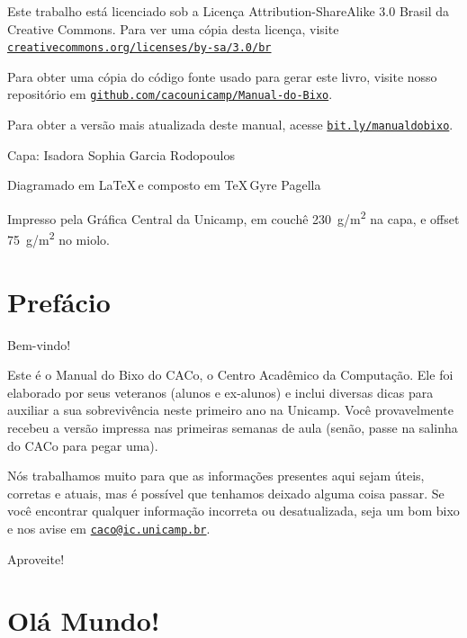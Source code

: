 \documentclass[a4paper,10pt,oldfontcommands]{memoir}
\newcommand{\email}[1]{\href{mailto:#1}{\nolinkurl{#1}}}
\renewcommand{\url}[1]{\href{http://#1}{\nolinkurl{#1}}}
\begin{document}
\begin{center}
Este trabalho está licenciado sob a Licença Attribution-ShareAlike 3.0 Brasil da
Creative Commons. Para ver uma cópia desta licença, visite
\url{creativecommons.org/licenses/by-sa/3.0/br}

Para obter uma cópia do código fonte usado para gerar este livro, visite nosso
repositório em \url{github.com/cacounicamp/Manual-do-Bixo}.

Para obter a versão mais atualizada deste manual, acesse \url{bit.ly/manualdobixo}.

Capa: Isadora Sophia Garcia Rodopoulos

\setlength{\parskip}{0em}
\vfill

Diagramado em \LaTeX\,e composto em \TeX\,Gyre Pagella

Impresso pela Gráfica Central da Unicamp, em couchê \SI{230}{g/m^2} na capa, e offset
\SI{75}{g/m^2} no miolo.

\end{center}
\cleardoublepage
\pagestyle{plain}
\tableofcontents

\chapter{Prefácio}
\setlength{\parskip}{1em}

Bem-vindo!

Este é o Manual do Bixo do CACo, o Centro Acadêmico da Computação. Ele foi
elaborado por seus veteranos (alunos e ex-alunos) e inclui diversas dicas para
auxiliar a sua sobrevivência neste primeiro ano na Unicamp. Você provavelmente
recebeu a versão impressa nas primeiras semanas de aula (senão, passe na salinha
do CACo para pegar uma).

Nós trabalhamos muito para que as informações presentes aqui sejam úteis,
corretas e atuais, mas é possível que tenhamos deixado alguma coisa passar. Se
você encontrar qualquer informação incorreta ou desatualizada, seja um bom bixo
e nos avise em \email{caco@ic.unicamp.br}.

Aproveite!

\setlength{\parskip}{0em}
\mainmatter
\pagestyle{headings}
\twocolumn
\chapter{Olá Mundo!}


\clearpage


\clearpage
\end{document}
